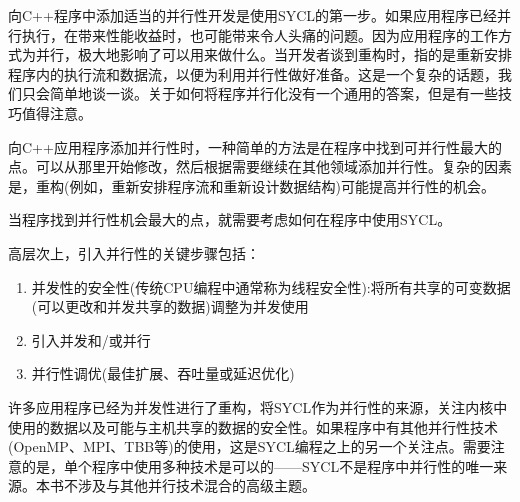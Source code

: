 向C++程序中添加适当的并行性开发是使用SYCL的第一步。如果应用程序已经并行执行，在带来性能收益时，也可能带来令人头痛的问题。因为应用程序的工作方式为并行，极大地影响了可以用来做什么。当开发者谈到重构时，指的是重新安排程序内的执行流和数据流，以便为利用并行性做好准备。这是一个复杂的话题，我们只会简单地谈一谈。关于如何将程序并行化没有一个通用的答案，但是有一些技巧值得注意。\par

向C++应用程序添加并行性时，一种简单的方法是在程序中找到可并行性最大的点。可以从那里开始修改，然后根据需要继续在其他领域添加并行性。复杂的因素是，重构(例如，重新安排程序流和重新设计数据结构)可能提高并行性的机会。\par

当程序找到并行性机会最大的点，就需要考虑如何在程序中使用SYCL。\par

高层次上，引入并行性的关键步骤包括：\par

\begin{enumerate}
	\item 并发性的安全性(传统CPU编程中通常称为线程安全性):将所有共享的可变数据(可以更改和并发共享的数据)调整为并发使用
	\item 引入并发和/或并行
	\item 并行性调优(最佳扩展、吞吐量或延迟优化)
\end{enumerate}

许多应用程序已经为并发性进行了重构，将SYCL作为并行性的来源，关注内核中使用的数据以及可能与主机共享的数据的安全性。如果程序中有其他并行性技术(OpenMP、MPI、TBB等)的使用，这是SYCL编程之上的另一个关注点。需要注意的是，单个程序中使用多种技术是可以的——SYCL不是程序中并行性的唯一来源。本书不涉及与其他并行技术混合的高级主题。\par




















































